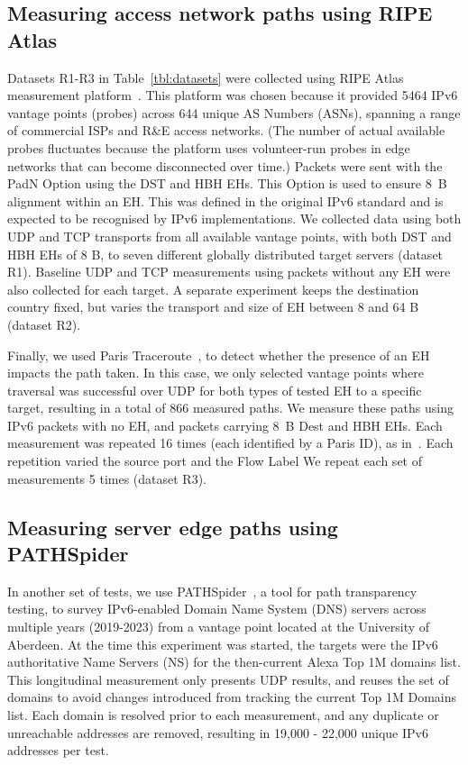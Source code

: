 \documentclass[conference]{IEEEtran}
\begin{document}
\subsection{Measuring access network paths using RIPE Atlas}
\label{sec:ripe-methodology}

Datasets R1-R3 in Table~\ref{tbl:datasets} were collected using RIPE Atlas measurement platform~\cite{bajpai2015lessons}.
This platform was chosen because it provided 5464 IPv6 vantage points (probes) across 644 unique AS Numbers (ASNs), spanning a range of commercial ISPs and R\&E access networks.  (The number of actual available probes fluctuates because the platform uses volunteer-run probes in edge networks that can become disconnected over time.) Packets were sent with the PadN Option using the DST and HBH EHs. This Option is used to ensure 8~B alignment within an EH. 
This was defined in the original IPv6 standard and is expected to be recognised by IPv6 implementations.
We collected data using both UDP and TCP transports from all available vantage points, with both DST and HBH EHs of 8 B, to seven different globally distributed target servers (dataset R1). Baseline UDP and TCP measurements using packets without any EH were also collected for each target.
A separate experiment keeps the destination country fixed, but varies the transport and size of EH between 8 and 64 B (dataset R2).

Finally, we used Paris Traceroute~\cite{augustin2006avoiding}, to detect whether the presence of an EH impacts the path taken. In this case, we only selected vantage points where traversal was successful over UDP for both types of tested EH to a specific target, resulting in a total of 866 measured paths.
We measure these paths using IPv6 packets with no EH, and packets carrying 8~B Dest and HBH EHs. Each measurement was repeated 16 times (each identified by  a Paris ID), as in~\cite{augustin2006avoiding}. Each repetition varied the source port and the Flow Label  We repeat each set of  measurements 5 times (dataset R3).


    \subsection{Measuring server edge paths using PATHSpider}
    \label{sec:pathspider-methodology}

In another set of tests, we use PATHSpider~\cite{learmonth2016pathspider}, a tool for path transparency testing, to survey IPv6-enabled Domain Name System (DNS) servers across multiple years (2019-2023) from a vantage point located at the University of Aberdeen. 
At the time this experiment was started, the targets were the IPv6 authoritative Name Servers (NS) for the then-current Alexa Top 1M domains list. 
This longitudinal measurement only presents UDP results, and reuses the set of domains to avoid changes introduced from tracking the current Top 1M Domains list. 
Each domain is resolved prior to each measurement, and any duplicate or unreachable addresses are removed, resulting in 19,000 - 22,000 unique IPv6 addresses per test.
\end{document}
